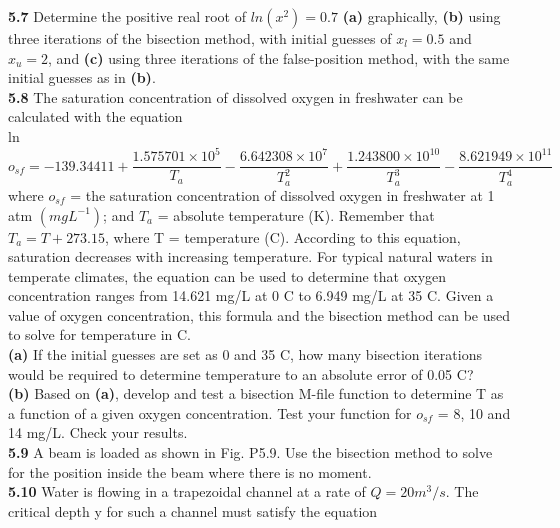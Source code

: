 \documentclass[../main.tex]{subfiles}
\begin{document}
\begin{multicols}{2}
    \noindent\textbf{5.7} Determine the positive real root of $ln(x^2) = 0.7$ \textbf{(a)}
    graphically, \textbf{(b)} using three iterations of the bisection
    method, with initial guesses of $x_l = 0.5$ and $x_u = 2$, and
    \textbf{(c)} using three iterations of the false-position method, with
    the same initial guesses as in \textbf{(b)}.\\

    \noindent\textbf{5.8} The saturation concentration of dissolved oxygen in
    freshwater can be calculated with the equation\\

    \noindent ln$o_{sf}=-139.34411+\dfrac{1.575701\times10^5}{T_a} - \dfrac{6.642308\times 10^7}{T^2_a} +
    \dfrac{1.243800\times 10^{10}}{T^3_a} - \dfrac{8.621949\times 10^{11}}{T^4_a}$\\

    \noindent where $o_{sf}$ = the saturation concentration of dissolved oxygen
    in freshwater at 1 atm $(mg L^{-1})$; and $T_a$ = absolute
    temperature (K). Remember that $T_a = T + 273.15$, where
    T = temperature (\textdegree C). According to this equation, saturation
    decreases with increasing temperature. For typical natural
    waters in temperate climates, the equation can be used to determine
    that oxygen concentration ranges from 14.621 mg/L
    at 0 \textdegree C to 6.949 mg/L at 35 \textdegree C. Given a value of oxygen concentration,
    this formula and the bisection method can be
    used to solve for temperature in \textdegree C.\\
    \textbf{(a)} If the initial guesses are set as 0 and 35 \textdegree C, how many
    bisection iterations would be required to determine temperature
    to an absolute error of 0.05 \textdegree C?\\
    \textbf{(b)} Based on \textbf{(a)}, develop and test a bisection M-file function
    to determine T as a function of a given oxygen concentration.
    Test your function for $o_{sf}$ = 8, 10 and 14 mg/L.
    Check your results.\\

    \noindent\textbf{5.9} A beam is loaded as shown in Fig. P5.9. Use the bisection
    method to solve for the position inside the beam where
    there is no moment.\\

    \noindent\textbf{5.10} Water is flowing in a trapezoidal channel at a rate of
    $Q = 20 m^3/s$. The critical depth y for such a channel must
    satisfy the equation\\


\end{multicols}
\end{document}
